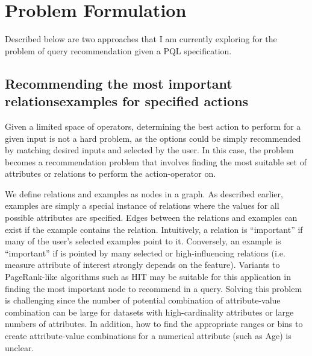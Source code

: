 \documentclass{sig-alternate-05-2015}
\begin{document}
\section{Problem Formulation}
Described below are two approaches that I am currently exploring for the problem of query recommendation given a PQL specification.
\subsection{Recommending the most important relations\/examples for specified actions}
\par Given a limited space of operators, determining the best action to perform for a given input is not a hard problem, as the options could be simply recommended by matching desired inputs and selected by the user. In this case, the problem becomes a recommendation problem that involves finding the most suitable set of attributes or relations to perform the action-operator on.
\par We define relations and examples as nodes in a graph. As described earlier, examples are simply a special instance of relations where the values for all possible attributes are specified. Edges between the relations and examples can exist if the example contains the relation. Intuitively, a relation is ``important'' if many of the user's selected examples point to it. Conversely, an example is ``important'' if is pointed by many selected or high-influencing relations (i.e. measure attribute of interest strongly depends on the feature). Variants to PageRank-like algorithms such as HIT\cite{Kleinberg1999} may be suitable for this application in finding the most important node to recommend in a query. Solving this problem is challenging since the number of potential combination of attribute-value combination can be large for datasets with high-cardinality attributes or large numbers of attributes. In addition, how to find the appropriate ranges or bins to create attribute-value combinations for a numerical attribute (such as Age) is unclear.
\end{document}
